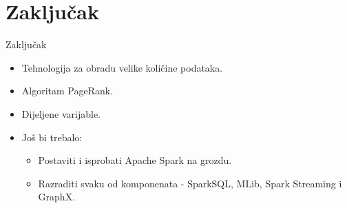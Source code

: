 \documentclass{beamer}
\begin{document}
\section{Zaključak}

\begin{frame}{Zaključak}
  \begin{itemize}
  \item
    Tehnologija za obradu velike količine podataka.
  \item
    Algoritam PageRank.
  \item
    Dijeljene varijable.
  \end{itemize}
  
  \begin{itemize}
  \item
    Još bi trebalo: 
    \begin{itemize}
    \item
      Postaviti i isprobati Apache Spark na grozdu.
    \item
      Razraditi svaku od komponenata - SparkSQL, MLib, Spark Streaming i GraphX.
    \end{itemize}
  \end{itemize}
\end{frame}
\end{document}

